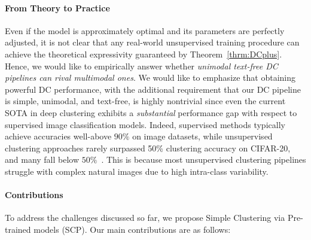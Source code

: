 
\paragraph{From Theory to Practice} Even if the model is approximately optimal and its parameters are perfectly adjusted, it is not clear that any real-world unsupervised training procedure can achieve the theoretical expressivity guaranteed by Theorem~\ref{thrm:DCplus}. Hence, we would like to empirically answer whether \textit{unimodal text-free DC pipelines can rival multimodal ones}. We would like to emphasize that obtaining powerful DC performance, with the additional requirement that our DC pipeline is simple, unimodal, and text-free, is highly nontrivial since even the current SOTA in deep clustering exhibits a \textit{substantial} performance gap with respect to supervised image classification models.  Indeed, supervised methods typically achieve accuracies well-above $90\%$ on image datasets, while unsupervised clustering approaches rarely surpassed 50\% clustering accuracy on CIFAR-20, and many fall below $50\%$~\cite{dang2021nearest,li2021contrastive,shen2021you,niu2022spice}. This is because most unsupervised clustering pipelines struggle with complex natural images due to high intra-class variability.


\paragraph{Contributions} To address the challenges discussed so far, we propose Simple Clustering via Pre-trained models (SCP). Our main contributions are as follows:

